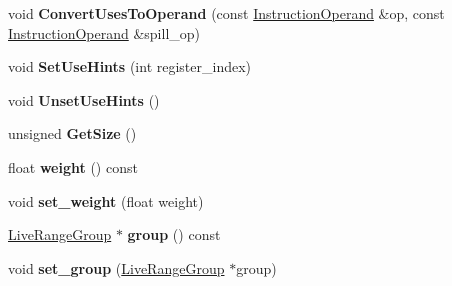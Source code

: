 \begin{DoxyCompactItemize}
\item 
void {\bfseries Convert\+Uses\+To\+Operand} (const \hyperlink{classv8_1_1internal_1_1compiler_1_1_instruction_operand}{Instruction\+Operand} \&op, const \hyperlink{classv8_1_1internal_1_1compiler_1_1_instruction_operand}{Instruction\+Operand} \&spill\+\_\+op)\hypertarget{classv8_1_1internal_1_1compiler_1_1_live_range_a9692c1a6751d90ffe208ce6d7a68ed49}{}\label{classv8_1_1internal_1_1compiler_1_1_live_range_a9692c1a6751d90ffe208ce6d7a68ed49}

\item 
void {\bfseries Set\+Use\+Hints} (int register\+\_\+index)\hypertarget{classv8_1_1internal_1_1compiler_1_1_live_range_a8eedd6d46ccdb74dbecbf6f498db1603}{}\label{classv8_1_1internal_1_1compiler_1_1_live_range_a8eedd6d46ccdb74dbecbf6f498db1603}

\item 
void {\bfseries Unset\+Use\+Hints} ()\hypertarget{classv8_1_1internal_1_1compiler_1_1_live_range_a1fcf65b7ec0fc8d55652f95a77f73295}{}\label{classv8_1_1internal_1_1compiler_1_1_live_range_a1fcf65b7ec0fc8d55652f95a77f73295}

\item 
unsigned {\bfseries Get\+Size} ()\hypertarget{classv8_1_1internal_1_1compiler_1_1_live_range_ad927a6800a70bca45465d47765d23b8f}{}\label{classv8_1_1internal_1_1compiler_1_1_live_range_ad927a6800a70bca45465d47765d23b8f}

\item 
float {\bfseries weight} () const \hypertarget{classv8_1_1internal_1_1compiler_1_1_live_range_ac94ee44ae79ee5ff2491488837e188a4}{}\label{classv8_1_1internal_1_1compiler_1_1_live_range_ac94ee44ae79ee5ff2491488837e188a4}

\item 
void {\bfseries set\+\_\+weight} (float weight)\hypertarget{classv8_1_1internal_1_1compiler_1_1_live_range_a87ab70cff1434d9c536581870afd5a13}{}\label{classv8_1_1internal_1_1compiler_1_1_live_range_a87ab70cff1434d9c536581870afd5a13}

\item 
\hyperlink{classv8_1_1internal_1_1compiler_1_1_live_range_group}{Live\+Range\+Group} $\ast$ {\bfseries group} () const \hypertarget{classv8_1_1internal_1_1compiler_1_1_live_range_aaeb3573a8f2ebb7192bbbdbeae6b29be}{}\label{classv8_1_1internal_1_1compiler_1_1_live_range_aaeb3573a8f2ebb7192bbbdbeae6b29be}

\item 
void {\bfseries set\+\_\+group} (\hyperlink{classv8_1_1internal_1_1compiler_1_1_live_range_group}{Live\+Range\+Group} $\ast$group)\hypertarget{classv8_1_1internal_1_1compiler_1_1_live_range_a39e98e27cb9fbd050a3632919a4aeddd}{}\label{classv8_1_1internal_1_1compiler_1_1_live_range_a39e98e27cb9fbd050a3632919a4aeddd}


\end{DoxyCompactItemize}
